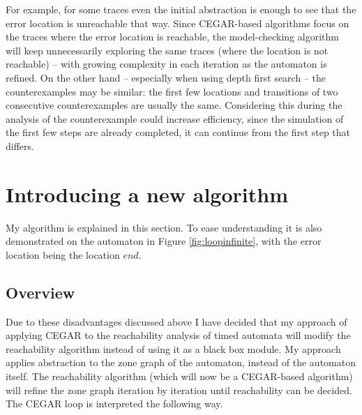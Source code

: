  For example, for some traces even the initial abstraction is enough to see that the error location is unreachable that way. Since CEGAR-based algorithms focus on the traces where the error location is reachable, the model-checking algorithm will keep unnecessarily exploring the same traces (where the location is not reachable) -- with growing complexity in each iteration as the automaton is refined. On the other hand -- especially when using depth first search -- the counterexamples may be similar: the first few locations and transitions of two consecutive counterexamples are usually the same. Considering this during the analysis of the counterexample could increase efficiency, since the simulation of the first few steps are already completed, it can continue from the first step that differs.
 

  
\section{Introducing a new algorithm}


My algorithm is explained in this section. To ease understanding it is also demonstrated on the automaton in Figure \ref{fig:loopinfinite}, with the error location being the location $end$.

\subsection{Overview}

 Due to these disadvantages discussed above I have decided that my approach of applying CEGAR to the reachability analysis of timed automata will modify the reachability algorithm instead of using it as a black box module. My approach applies abstraction to the zone graph of the automaton, instead of the automaton itself. The reachability algorithm (which will now be a CEGAR-based algorithm) will refine the zone graph iteration by iteration until reachability can be decided. The CEGAR loop is interpreted the following way.

